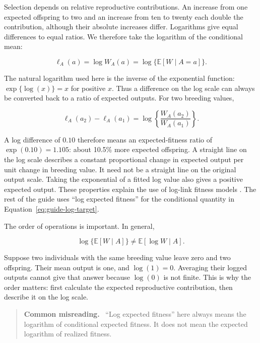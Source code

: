 \documentclass[11pt]{article}
\newcommand{\E}{\mathbb{E}}
\newenvironment{commonreading}
  {\begin{quote}\small\noindent\textbf{Common misreading.}\ }
  {\end{quote}}
\newcounter{answer}
\begin{document}
Selection depends on relative reproductive contributions. An increase from one expected offspring to two and an increase from ten to twenty each double the contribution, although their absolute increases differ. Logarithms give equal differences to equal ratios. We therefore take the logarithm of the conditional mean:

\begin{equation}
\ell_A(a)=\log W_A(a)=\log\{\E[W\mid A=a]\}.
\label{eq:guide-log-target}
\end{equation}

The natural logarithm used here is the inverse of the exponential function: $\exp\{\log(x)\}=x$ for positive $x$. Thus a difference on the log scale can always be converted back to a ratio of expected outputs. For two breeding values,

\begin{equation}
\ell_A(a_2)-\ell_A(a_1)
=\log\left\{\frac{W_A(a_2)}{W_A(a_1)}\right\}.
\end{equation}

A log difference of $0.10$ therefore means an expected-fitness ratio of $\exp(0.10)=1.105$: about 10.5\% more expected offspring. A straight line on the log scale describes a constant proportional change in expected output per unit change in breeding value. It need not be a straight line on the original output scale. Taking the exponential of a fitted log value also gives a positive expected output. These properties explain the use of log-link fitness models \citep{MorrisseyGoudie2022}. The rest of the guide uses ``log expected fitness'' for the conditional quantity in Equation~\eqref{eq:guide-log-target}.

The order of operations is important.  In general,

\begin{equation}
\log\{\E[W\mid A]\}\ne \E[\log W\mid A].
\label{eq:guide-jensen}
\end{equation}

Suppose two individuals with the same breeding value leave zero and two offspring. Their mean output is one, and $\log(1)=0$. Averaging their logged outputs cannot give that answer because $\log(0)$ is not finite. This is why the order matters: first calculate the expected reproductive contribution, then describe it on the log scale.

\begin{commonreading}
``Log expected fitness'' here always means the logarithm of conditional
expected fitness.  It does not mean the expected logarithm of realized
fitness.
\end{commonreading}
\end{document}
